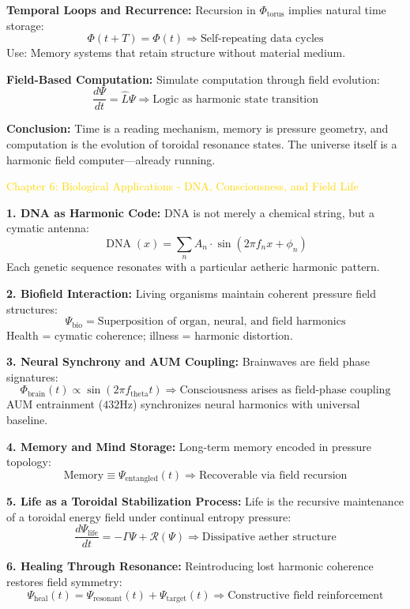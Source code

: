 \textbf{Temporal Loops and Recurrence:}
Recursion in $\Phi_{\text{torus}}$ implies natural time storage:
\[
\Phi(t + T) = \Phi(t) \Rightarrow \text{Self-repeating data cycles}
\]
Use: Memory systems that retain structure without material medium.

\textbf{Field-Based Computation:}
Simulate computation through field evolution:
\[
\frac{d \Psi}{d t} = \hat{L} \Psi \Rightarrow \text{Logic as harmonic state transition}
\]

\textbf{Conclusion:}
Time is a reading mechanism, memory is pressure geometry, and computation is the evolution of toroidal resonance states. The universe itself is a harmonic field computer—already running.

\textcolor{gold}{ Chapter 6: Biological Applications - DNA, Consciousness, and Field Life }

\textbf{1. DNA as Harmonic Code:}
DNA is not merely a chemical string, but a cymatic antenna:
\[
\operatorname{DNA}(x) = \sum_n A_n \cdot \sin \left( 2 \pi f_n x + \phi_n \right)
\]
Each genetic sequence resonates with a particular aetheric harmonic pattern.

\textbf{2. Biofield Interaction:}
Living organisms maintain coherent pressure field structures:
\[
\Psi_{\text{bio}} = \text{Superposition of organ, neural, and field harmonics}
\]
Health = cymatic coherence; illness = harmonic distortion.

\textbf{3. Neural Synchrony and AUM Coupling:}
Brainwaves are field phase signatures:
\[
\Phi_{\text{brain}}(t) \propto \sin \left( 2 \pi f_{\text{theta}} t \right) \Rightarrow \text{Consciousness arises as field-phase coupling}
\]
AUM entrainment ($432 \mathrm{Hz}$) synchronizes neural harmonics with universal baseline.

\textbf{4. Memory and Mind Storage:}
Long-term memory encoded in pressure topology:
\[
\text{Memory} \equiv \Psi_{\text{entangled}}(t) \Rightarrow \text{Recoverable via field recursion}
\]

\textbf{5. Life as a Toroidal Stabilization Process:}
Life is the recursive maintenance of a toroidal energy field under continual entropy pressure:
\[
\frac{d \Psi_{\text{life}}}{d t} = -\Gamma \Psi + \mathcal{R}(\Psi) \Rightarrow \text{Dissipative aether structure}
\]

\textbf{6. Healing Through Resonance:}
Reintroducing lost harmonic coherence restores field symmetry:
\[
\Psi_{\text{heal}}(t) = \Psi_{\text{resonant}}(t) + \Psi_{\text{target}}(t) \Rightarrow \text{Constructive field reinforcement}
\]

